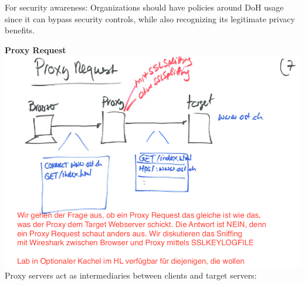 For security awareness: Organizations should have policies around DoH usage since it can bypass security controls, while also recognizing its legitimate privacy benefits.


\textbf{Proxy Request}
\includegraphics[scale=0.5]{resources/03-proxy-request.png}
Proxy servers act as intermediaries between clients and target servers:

